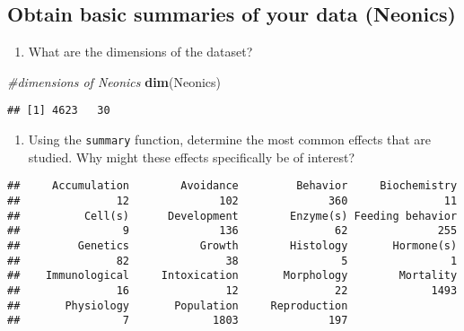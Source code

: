 \documentclass[]{article}
\newenvironment{Shaded}{\begin{snugshade}}{\end{snugshade}}
\newcommand{\CommentTok}[1]{\textcolor[rgb]{0.56,0.35,0.01}{\textit{#1}}}
\newcommand{\KeywordTok}[1]{\textcolor[rgb]{0.13,0.29,0.53}{\textbf{#1}}}
\newcommand{\NormalTok}[1]{#1}
\newcommand{\OperatorTok}[1]{\textcolor[rgb]{0.81,0.36,0.00}{\textbf{#1}}}
\providecommand{\tightlist}{%
  \setlength{\itemsep}{0pt}\setlength{\parskip}{0pt}}
\begin{document}
\hypertarget{obtain-basic-summaries-of-your-data-neonics}{%
\subsection{Obtain basic summaries of your data
(Neonics)}\label{obtain-basic-summaries-of-your-data-neonics}}

\begin{enumerate}
\def\labelenumi{\arabic{enumi}.}
\setcounter{enumi}{4}
\tightlist
\item
  What are the dimensions of the dataset?
\end{enumerate}

\begin{Shaded}
\begin{Highlighting}[]
\CommentTok{#dimensions of Neonics}
\KeywordTok{dim}\NormalTok{(Neonics)}
\end{Highlighting}
\end{Shaded}

\begin{verbatim}
## [1] 4623   30
\end{verbatim}

\begin{enumerate}
\def\labelenumi{\arabic{enumi}.}
\setcounter{enumi}{5}
\tightlist
\item
  Using the \texttt{summary} function, determine the most common effects
  that are studied. Why might these effects specifically be of interest?
\end{enumerate}

\begin{Shaded}
\end{Shaded}

\begin{verbatim}
##     Accumulation        Avoidance         Behavior     Biochemistry 
##               12              102              360               11 
##          Cell(s)      Development        Enzyme(s) Feeding behavior 
##                9              136               62              255 
##         Genetics           Growth        Histology       Hormone(s) 
##               82               38                5                1 
##    Immunological     Intoxication       Morphology        Mortality 
##               16               12               22             1493 
##       Physiology       Population     Reproduction 
##                7             1803              197
\end{verbatim}
\end{document}
